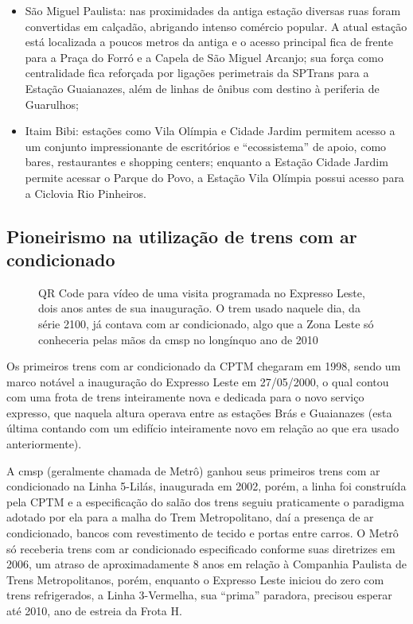 \documentclass[11pt,fleqn]{book} %
\begin{document}
\begin{itemize}
\begin{itemize}
			\item São Miguel Paulista: nas proximidades da antiga estação diversas ruas foram convertidas em calçadão, abrigando intenso comércio popular. A atual estação está localizada a poucos metros da antiga e o acesso principal fica de frente para a Praça do Forró e a Capela de São Miguel Arcanjo; sua força como centralidade fica reforçada por ligações perimetrais da SPTrans para a Estação Guaianazes, além de linhas de ônibus com destino à periferia de Guarulhos;
			\item Itaim Bibi: estações como Vila Olímpia e Cidade Jardim permitem acesso a um conjunto impressionante de escritórios e “ecossistema” de apoio, como bares, restaurantes e shopping centers; enquanto a Estação Cidade Jardim permite acessar o Parque do Povo, a Estação Vila Olímpia possui acesso para a Ciclovia Rio Pinheiros.
		\end{itemize}
\end{itemize}

\subsection{Pioneirismo na utilização de trens com ar condicionado}

\begin{wrapfigure}{l}{0.5\textwidth}
	\centering
	\caption[QR Code para vídeo do Expresso Leste em 1998]{QR Code para vídeo de uma visita programada no Expresso Leste, dois anos antes de sua inauguração. O trem usado naquele dia, da série 2100, já contava com ar condicionado, algo que a Zona Leste só conheceria pelas mãos da \gls{cmsp} no longínquo ano de 2010}
	\label{qr:video_1998_l11}
\end{wrapfigure}

Os primeiros trens com ar condicionado da CPTM chegaram em 1998, sendo um marco notável a inauguração do Expresso Leste em 27/05/2000, o qual contou com uma frota de trens inteiramente nova e dedicada para o novo serviço expresso, que naquela altura operava entre as estações Brás e Guaianazes (esta última contando com um edifício inteiramente novo em relação ao que era usado anteriormente).

A \glsdesc{cmsp} (geralmente chamada de Metrô) ganhou seus primeiros trens com ar condicionado na Linha 5-Lilás, inaugurada em 2002, porém, a linha foi construída pela CPTM e a especificação do salão dos trens seguiu praticamente o paradigma adotado por ela para a malha do Trem Metropolitano, daí a presença de ar condicionado, bancos com revestimento de tecido e portas entre carros. O Metrô só receberia trens com ar condicionado especificado conforme suas diretrizes em 2006, um atraso de aproximadamente 8 anos em relação à Companhia Paulista de Trens Metropolitanos, porém, enquanto o Expresso Leste iniciou do zero com trens refrigerados, a Linha 3-Vermelha, sua “prima” paradora, precisou esperar até 2010, ano de estreia da Frota H.
\end{document}
